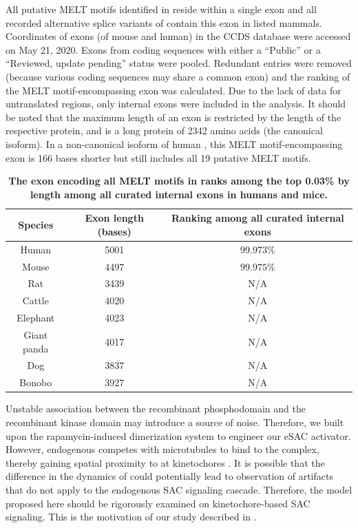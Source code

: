 \begin{table}
    \renewcommand{\arraystretch}{1.5}
    \caption{\textbf{The exon encoding all MELT motifs in  ranks among the top 0.03\% by length among all curated internal exons in humans and mice.}}
    \noindent\justifying All putative MELT motifs identified in \cite{MELTEvolution} reside within a single exon and all recorded alternative splice variants of  contain this exon in listed mammals. Coordinates of exons (of mouse and human) in the CCDS database \cite{CCDS} were accessed on May 21, 2020. Exons from coding sequences with either a ``Public'' or a ``Reviewed, update pending'' status were pooled. Redundant entries were removed (because various coding sequences may share a common exon) and the ranking of the MELT motif-encompassing exon was calculated. Due to the lack of data for untranslated regions, only internal exons were included in the analysis. It should be noted that the maximum length of an exon is restricted by the length of the respective protein, and  is a long protein of \SI{2342}{} amino acids (the canonical isoform). In a non-canonical isoform of human , this MELT motif-encompassing exon is 166 bases shorter but still includes all 19 putative MELT motifs.
    \label{ExonLength}
    \begin{center}
        \begin{tabular}{c c c}
            \hline
            Species & Exon length (bases) & Ranking among all curated internal exons\\
            \hline
            Human & 5001 & $99.973\%$\\
            Mouse & 4497 & $99.975\%$\\
            Rat & 3439 & N/A\\
            Cattle & 4020 & N/A\\
            Elephant & 4023 & N/A\\ %
            Giant panda & 4017 & N/A\\
            Dog & 3837 & N/A\\
            Bonobo & 3927 & N/A\\
            \hline
        \end{tabular}
    \end{center}
\end{table}

Unstable association between the recombinant  phosphodomain and the recombinant  kinase domain may introduce a source of noise. Therefore, we built upon the rapamycin-induced dimerization system to engineer our eSAC activator. However, endogenous  competes with microtubules to bind to the  complex, thereby gaining spatial proximity to  at kinetochores \cite{MPS1Localization_Ji, MPS1Localization_Hiruma}. It is possible that the difference in the dynamics of  could potentially lead to observation of artifacts that do not apply to the endogenous SAC signaling cascade. Therefore, the model proposed here should be rigorously examined on kinetochore-based SAC signaling. This is the motivation of our study described in .

